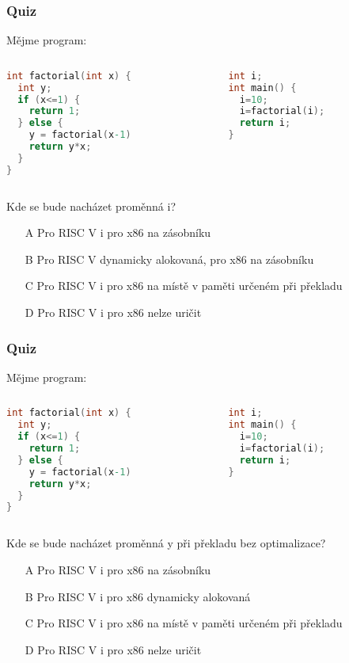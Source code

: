 \documentclass{beamer}
\begin{document}
\begin{frame}[fragile]
\frametitle{Quiz}

Mějme program:
\begin{columns}
\begin{column}{0.45\textwidth}
\begin{lstlisting}[language={C},columns=flexible]
int factorial(int x) {
  int y;
  if (x<=1) {
    return 1;
  } else {
    y = factorial(x-1)
    return y*x;
  }
}
\end{lstlisting}
\end{column}
\hfill
\begin{column}{0.45\textwidth}  
\begin{lstlisting}[language={C},columns=flexible]
int i;
int main() {
  i=10;
  i=factorial(i);
  return i;
}
\end{lstlisting}
\end{column}
\end{columns}

Kde se bude nacházet proměnná i?
\begin{itemize}
\item[A] Pro RISC V i pro x86 na zásobníku
\item[B] Pro RISC V dynamicky alokovaná, pro x86 na zásobníku
\item[C] Pro RISC V i pro x86 na místě v paměti určeném při překladu
\item[D] Pro RISC V i pro x86 nelze uričit
\end{itemize}
\end{frame}


\begin{frame}[fragile]
\frametitle{Quiz}

Mějme program:
\begin{columns}
\begin{column}{0.45\textwidth}
\begin{lstlisting}[language={C},columns=flexible]
int factorial(int x) {
  int y;
  if (x<=1) {
    return 1;
  } else {
    y = factorial(x-1)
    return y*x;
  }
}
\end{lstlisting}
\end{column}
\hfill
\begin{column}{0.45\textwidth}  
\begin{lstlisting}[language={C},columns=flexible]
int i;
int main() {
  i=10;
  i=factorial(i);
  return i;
}
\end{lstlisting}
\end{column}
\end{columns}

Kde se bude nacházet proměnná y při překladu bez optimalizace?
\begin{itemize}
\item[A] Pro RISC V i pro x86 na zásobníku
\item[B] Pro RISC V i pro x86 dynamicky alokovaná
\item[C] Pro RISC V i pro x86 na místě v paměti určeném při překladu
\item[D] Pro RISC V i pro x86 nelze uričit
\end{itemize}
\end{frame}
\end{document}
